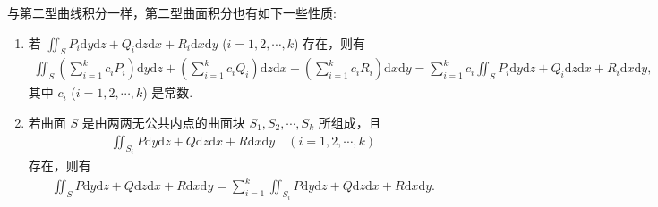 \documentclass[../../main.tex]{subfiles}%
\begin{document}
\begin{proposition}
与第二型曲线积分一样，第二型曲面积分也有如下一些性质:
\begin{enumerate}[(1)]
\item 若 $\iint_S P_i \mathrm{d}y\mathrm{d}z + Q_i \mathrm{d}z\mathrm{d}x + R_i \mathrm{d}x\mathrm{d}y$ ($i=1, 2, \cdots, k$) 存在，则有
\begin{align*}
\iint_S \left(\sum\limits_{i=1}^k c_i P_i\right) \mathrm{d}y\mathrm{d}z + \left(\sum\limits_{i=1}^k c_i Q_i\right) \mathrm{d}z\mathrm{d}x + \left(\sum\limits_{i=1}^k c_i R_i\right) \mathrm{d}x\mathrm{d}y = \sum\limits_{i=1}^k c_i \iint_S P_i \mathrm{d}y\mathrm{d}z + Q_i \mathrm{d}z\mathrm{d}x + R_i \mathrm{d}x\mathrm{d}y,
\end{align*}
其中 $c_i$ ($i=1, 2, \cdots, k$) 是常数.
\item 若曲面 $S$ 是由两两无公共内点的曲面块 $S_1, S_2, \cdots, S_k$ 所组成，且
\begin{align*}
\iint_{S_i} P \mathrm{d}y\mathrm{d}z + Q \mathrm{d}z\mathrm{d}x + R \mathrm{d}x\mathrm{d}y \quad (i=1, 2, \cdots, k)
\end{align*}
存在，则有
\begin{align*}
\iint_S P \mathrm{d}y\mathrm{d}z + Q \mathrm{d}z\mathrm{d}x + R \mathrm{d}x\mathrm{d}y = \sum\limits_{i=1}^k \iint_{S_i} P \mathrm{d}y\mathrm{d}z + Q \mathrm{d}z\mathrm{d}x + R \mathrm{d}x\mathrm{d}y.
\end{align*}
\end{enumerate}
\end{proposition}
\end{document}
